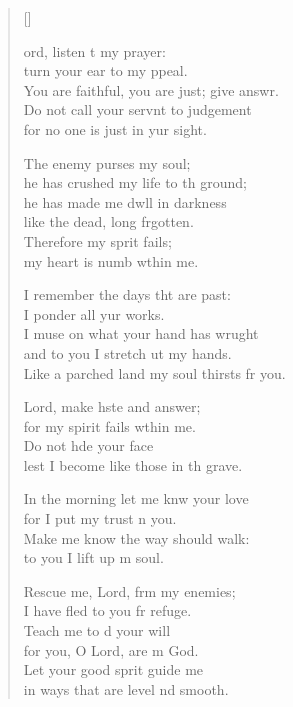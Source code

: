 \settowidth{\versewidth}{You are faithful, you are just; give answer. +}
\begin{verse}[\versewidth]
  \begin{patverse}
    ord, listen t my prayer:\Med\\
    turn your ear to my ppeal.\\
    You are faithful, you are just; give answr.\Flex\\
    Do not call your servnt to judgement\\
    for no one is just in yur sight.

    The enemy purses my soul;\Med\\
    he has crushed my life to th ground;\\
    he has made me dwll in darkness\Med\\
    like the dead, long frgotten.\\
    Therefore my sp\pointup{\i}rit fails;\Med\\
    my heart is numb w\pointup{\i}thin me.

    I remember the days tht are past:\Med\\
    I ponder all yur works.\\
    I muse on what your hand has wrught\Flex\\
    and to you I stretch ut my hands.\Med\\
    Like a parched land my soul thirsts fr you.

    Lord, make hste and answer;\Med\\
    for my spirit fails w\pointup{\i}thin me.\\
    Do not h\pointup{\i}de your face\Med\\
    lest I become like those in th grave.

    In the morning let me knw your love\Med\\
    for I put my trust \pointup{\i}n you.\\
    Make me know the way  should walk:\Med\\
    to you I lift up m soul.

    Rescue me, Lord, frm my enemies;\Med\\
    I have fled to you fr refuge.\\
    Teach me to d your will\Med\\
    for you, O Lord, are m God.\\
    Let your good sp\pointup{\i}rit guide me\Med\\
    in ways that are level nd smooth.


\end{patverse}
\end{verse}
